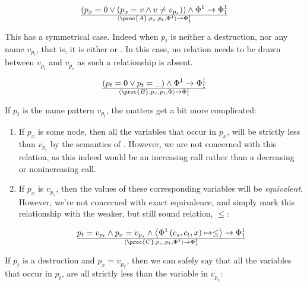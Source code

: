 \begin{equation}\label{eq:sct-pattern-source-fail}
{
\left(
    p_x = 0
  \vee
\left(
    p_x = v
  \wedge
    v\neq v_{p_s}
\right)
\right)
  \wedge
    \Phi^1\rightarrow\Phi^1_1
}\over{
  \left\langle\proc{A},p_x,p_t,\Phi^1\right\rangle
  \rightarrow
  \Phi^1_1
}
\end{equation}

This has a symmetrical case. Indeed when $p_t$ is neither a destruction, nor
any name $v_{p_t}$, that is, it is either \mono{\_} or . In this case,
no relation needs to be drawn between $v_{p_t}$ and $v_{p_s}$ as such a
relationship is absent.

\begin{equation}
{
\left(
    p_t = 0
\vee
    p_t = \_
\right)
  \wedge
    \Phi^1\rightarrow\Phi^1_1
}\over{
  \left\langle\proc{B},p_x,p_t,\Phi\right\rangle
  \rightarrow
  \Phi^1_1
}
\end{equation}

If $p_t$ is the name pattern $v_{p_t}$, the matters get a bit more complicated:

\begin{enumerate}

\item If $p_x$ is some node, then all the variables that occur in $p_x$, will
be strictly less than $v_{p_t}$ by the semantics of \D{}. However, we are not
concerned with this relation, as this indeed would be an increasing call rather
than a decreasing or nonincreasing call.

\item If $p_x$ is $v_{p_s}$, then the values of these corresponding variables
will be \emph{equivalent}. However, we're not concerned with exact equivalence,
and simply mark this relationship with the weaker, but still sound relation,
$\leq$:

\begin{equation}
{
    p_t = v_{p_t}
  \wedge
    p_x = v_{p_s}
  \wedge
    \left\langle\Phi^1\left(c_s, c_t, x\right)\mapsto \leq\right\rangle\rightarrow\Phi^1_1
}\over{
  \left\langle\proc{C},p_x,p_t,\Phi^1\right\rangle
  \rightarrow
  \Phi^1_1
}
\end{equation}

\end{enumerate}

If $p_t$ is a destruction and $p_x = v_{p_x}$, then we can safely say that all
the variables that occur in $p_t$, are all strictly less than the variable in
$v_{p_x}$:

